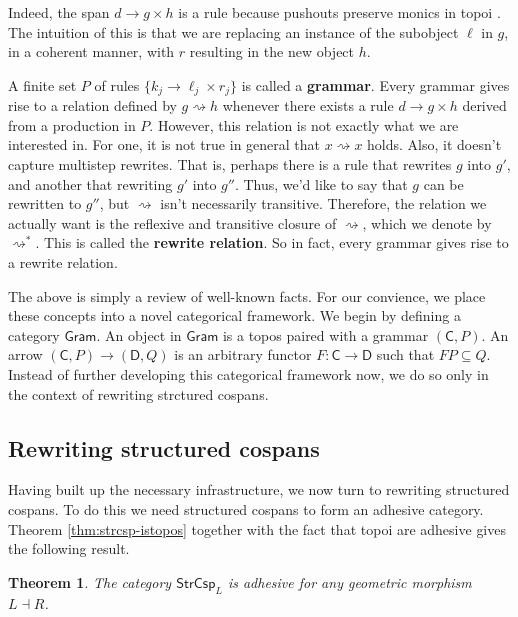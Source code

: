 \documentclass{amsart}
\newcommand{\Gram}{\cat{Gram}}
\newcommand{\StrCsp}{\cat{StrCsp}}
\newcommand{\defn}[1]{\textbf{#1}}
\newcommand{\cat}[1]{\mathsf{#1}}
\newcommand{\from}{\colon}
\newcommand{\dderiv}[2]{#1 \rightsquigarrow #2}
\newcommand{\spn}[3]{#2 \to #1 \times #3}
\newtheorem{theorem}{Theorem}[section]
\theoremstyle{remark}
\theoremstyle{definition}
\begin{document}
%
Indeed, the span $ \spn{g}{d}{h} $ is a rule because pushouts preserve
monics in topoi \cite[Lem.~12]{LackSobo_Adhesive}. The intuition of
this is that we are replacing an instance of the subobject $ \ell $ in $
g $, in a coherent manner, with $ r $ resulting in the new object $ h
$.

A finite set $ P $ of rules $ \{ \spn{\ell_j}{k_j}{r_j} \} $ is called
a \defn{grammar}.  Every grammar gives rise to a relation defined by
$ \dderiv{g}{h} $ whenever there exists a rule $ \spn{g}{d}{h} $
derived from a production in $ P $. However, this relation is not
exactly what we are interested in.  For one, it is not true in general
that $ \dderiv{x}{x} $ holds. Also, it doesn't capture multistep
rewrites. That is, perhaps there is a rule that rewrites $ g $ into
$ g' $, and another that rewriting $ g' $ into $ g'' $.  Thus, we'd
like to say that $ g $ can be rewritten to $ g'' $, but
$ \rightsquigarrow $ isn't necessarily transitive.  Therefore, the
relation we actually want is the reflexive and transitive closure of
$ \rightsquigarrow $, which we denote by $ \rightsquigarrow^\ast $.
This is called the \defn{rewrite relation}.  So in fact, every
grammar gives rise to a rewrite relation.

The above is simply a review of well-known facts.  For our convience,
we place these concepts into a novel categorical framework.  We begin
by defining a category $ \Gram $. An object in $ \Gram $ is a topos
paired with a grammar $ ( \cat{ C },P ) $.  An arrow
$ ( \cat{ C },P ) \to ( \cat{ D } , Q ) $ is an arbitrary functor
$ F \from \cat{ C } \to \cat{ D } $ such that $ FP \subseteq Q
$. Instead of further developing this categorical framework now, we do
so only in the context of rewriting strctured cospans.


\subsection{Rewriting structured cospans}
\label{sec:Rewriting-StrCsp}

Having built up the necessary infrastructure, we now turn to rewriting
structured cospans. To do this we need structured cospans to form an
adhesive category. Theorem \ref{thm:strcsp-istopos} together with the
fact that topoi are adhesive \cite{LackSobo_ToposIsAdh} gives the
following result.

\begin{theorem} \label{thm:dpo_category-StrCsp-adhsv}
  The category $ \StrCsp_{L} $ is adhesive for any geometric morphism
  $ L \dashv R $.
\end{theorem}
\end{document}
